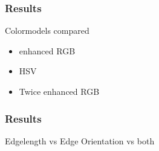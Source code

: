\documentclass{beamer}
\begin{document}
\begin{frame}
	\frametitle{Results}
    \begin{block}{Colormodels compared}
    	\begin{itemize}
    		\item enhanced RGB
    		\item HSV
    		\item Twice enhanced RGB
    	\end{itemize}
    \end{block}
\end{frame}

\begin{frame}
	\frametitle{Results}
    \begin{block}{Edgelength vs Edge Orientation vs both}
    \end{block}
\end{frame}
\end{document}
